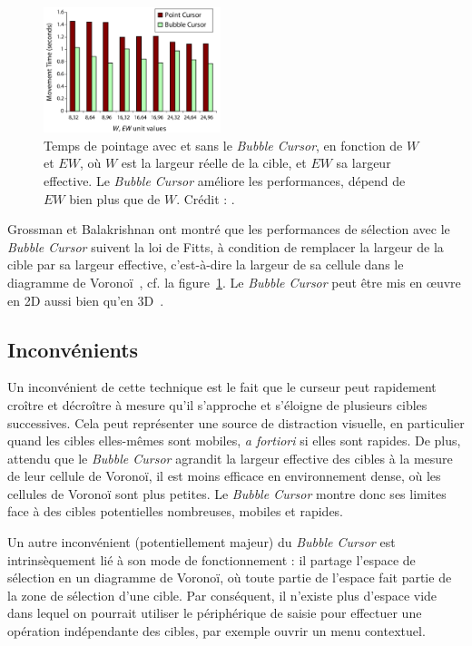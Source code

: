 	\begin{figure} %
		\centering
		\includegraphics[width=0.46\textwidth]{figures/ch2/bubbleResults}
		\caption[\emph{Bubble Cursor} --  performances]{Temps de pointage avec et sans le \emph{Bubble Cursor}, en fonction de $W$ et $EW$, où $W$ est la largeur réelle de la cible, et $EW$ sa largeur effective. Le \emph{Bubble Cursor} améliore les performances, dépend de $EW$ bien plus que de $W$. Crédit : \cite{grossman2005bubble}.}
		\label{fig:bubbleResults}
	\end{figure}
	
	Grossman et Balakrishnan ont montré que les performances de sélection avec le \emph{Bubble Cursor} suivent la loi de Fitts, à condition de remplacer la largeur de la cible par sa largeur effective, c'est-à-dire la largeur de sa cellule dans le diagramme de Voronoï~\cite{grossman2005bubble}, cf. la figure~\ref{fig:bubbleResults}. Le \emph{Bubble Cursor} peut être mis en œuvre en 2D aussi bien qu'en 3D~\cite{vanacken2007exploring}.

	\subsection{Inconvénients}
	Un inconvénient de cette technique est le fait que le curseur peut rapidement croître et décroître à mesure qu'il s'approche et s'éloigne de plusieurs cibles successives. Cela peut représenter une source de distraction visuelle, en particulier quand les cibles elles-mêmes sont mobiles, \emph{a fortiori} si elles sont rapides. De plus, attendu que le \emph{Bubble Cursor} agrandit la largeur effective des cibles à la mesure de leur cellule de Voronoï, il est moins efficace en environnement dense, où les cellules de Voronoï sont plus petites. Le \emph{Bubble Cursor} montre donc ses limites face à des cibles potentielles nombreuses, mobiles et rapides.
	
	Un autre inconvénient (potentiellement majeur) du \emph{Bubble Cursor} est intrinsèquement lié à son mode de fonctionnement : il partage l'espace de sélection en un diagramme de Voronoï, où toute partie de l'espace fait partie de la zone de sélection d'une cible. Par conséquent, il n'existe plus d'espace \og vide \fg{} dans lequel on pourrait utiliser le périphérique de saisie pour effectuer une opération indépendante des cibles, par exemple ouvrir un menu contextuel.

